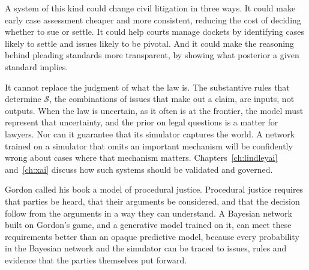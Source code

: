 A system of this kind could change civil litigation in three ways. It could make early case assessment cheaper and more consistent, reducing the cost of deciding whether to sue or settle. It could help courts manage dockets by identifying cases likely to settle and issues likely to be pivotal. And it could make the reasoning behind pleading standards more transparent, by showing what posterior a given standard implies.

It cannot replace the judgment of what the law is. The substantive rules that determine $\mathcal{S}$, the combinations of issues that make out a claim, are inputs, not outputs. When the law is uncertain, as it often is at the frontier, the model must represent that uncertainty, and the prior on legal questions is a matter for lawyers. Nor can it guarantee that its simulator captures the world. A network trained on a simulator that omits an important mechanism will be confidently wrong about cases where that mechanism matters. Chapters~\ref{ch:lindleyai} and~\ref{ch:xai} discuss how such systems should be validated and governed.

Gordon called his book a model of procedural justice. Procedural justice requires that parties be heard, that their arguments be considered, and that the decision follow from the arguments in a way they can understand. A Bayesian network built on Gordon's game, and a generative model trained on it, can meet these requirements better than an opaque predictive model, because every probability in the Bayesian network and the simulator can be traced to issues, rules and evidence that the parties themselves put forward.


